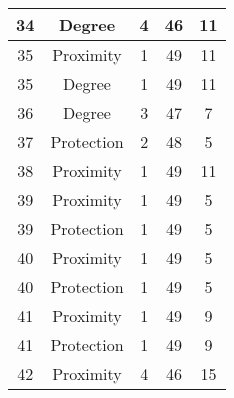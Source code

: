 \documentclass[results.tex]{subfiles}
\begin{document}
\begin{center}
\begin{tabular}{| c || c | c | c | c |}
            \hline
            34                      & Degree                       & 4                      & 46                      & 11                   \\
            \hline
            35                      & Proximity                    & 1                      & 49                      & 11                   \\
            \hline
            35                      & Degree                       & 1                      & 49                      & 11                   \\
            \hline
            36                      & Degree                       & 3                      & 47                      & 7                    \\
            \hline
            37                      & Protection                   & 2                      & 48                      & 5                    \\
            \hline
            38                      & Proximity                    & 1                      & 49                      & 11                   \\
            \hline
            39                      & Proximity                    & 1                      & 49                      & 5                    \\
            \hline
            39                      & Protection                   & 1                      & 49                      & 5                    \\
            \hline
            40                      & Proximity                    & 1                      & 49                      & 5                    \\
            \hline
            40                      & Protection                   & 1                      & 49                      & 5                    \\
            \hline
            41                      & Proximity                    & 1                      & 49                      & 9                    \\
            \hline
            41                      & Protection                   & 1                      & 49                      & 9                    \\
            \hline
            42                      & Proximity                    & 4                      & 46                      & 15                   \\

\end{tabular}
\end{center}
\end{document}
